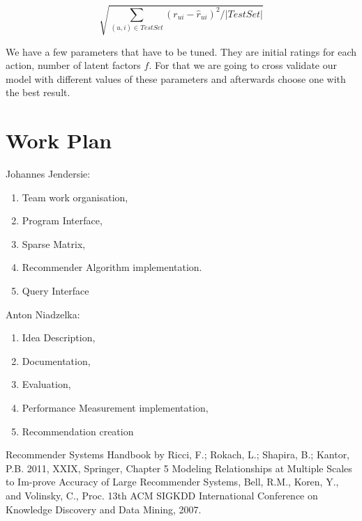 \documentclass[a4paper,11pt]{article}
\begin{document}
\begin{equation} \label{2} \sqrt{ \sum_{(u,i) \in TestSet} (r_{u i} - \hat{r}_{u i} ) ^2 / \left| TestSet \right| } \end{equation}

We have a few parameters that have to be tuned. They are initial ratings for each action, number of latent factors $ f $. For that we are going to cross validate our model with different values of these parameters and afterwards choose one with the best result. 

\section{Work Plan}

Johannes Jendersie:

\begin{enumerate}
\item Team work organisation,
\item Program Interface,
\item Sparse Matrix,
\item Recommender Algorithm implementation.
\item Query Interface
\end{enumerate}


Anton Niadzelka:

\begin{enumerate}
\item Idea Description, 
\item Documentation,
\item Evaluation,
\item Performance Measurement implementation,
\item Recommendation creation
\end{enumerate}

\begin{thebibliography}{99}
 Recommender Systems Handbook by Ricci, F.; Rokach, L.; Shapira, B.; Kantor, P.B. 2011, XXIX, Springer,  Chapter 5
  Modeling Relationships at Multiple Scales to Im-prove Accuracy of Large Recommender Systems, Bell, R.M., Koren, Y., and Volinsky, C., Proc. 13th ACM SIGKDD International
Conference on Knowledge Discovery and Data Mining, 2007.
\end{thebibliography}
\nocite{*}


\end{document}
